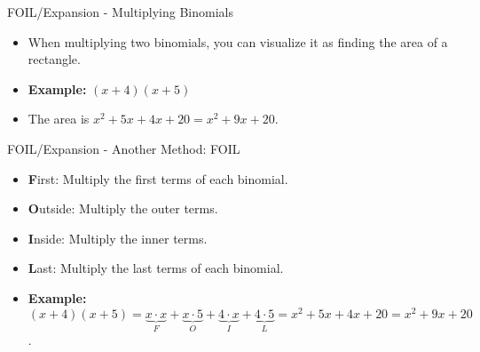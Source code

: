 \documentclass[aspectratio=169]{beamer}
\begin{document}
\begin{frame}{FOIL/Expansion - Multiplying Binomials}
    \begin{tcolorbox}[colback=lightgray,colframe=primary,title=Multiplying Binomials]
        \scriptsize
        \begin{itemize}
            \setlength{\itemsep}{0pt}
            \item When multiplying two binomials, you can visualize it as finding the area of a rectangle.
            \item \textbf{Example: } $(x+4)(x+5)$
            \vspace*{0.5em}
            \begin{center}
            \end{center}
            \vspace*{-0.7em}
            \item The area is $x^2 + 5x + 4x + 20 = x^2 + 9x + 20$.
        \end{itemize}
    \end{tcolorbox}
\end{frame}

\begin{frame}{FOIL/Expansion - Another Method: FOIL}
    \begin{tcolorbox}[colback=lightgray,colframe=primary,title=Another Method: FOIL]
        \scriptsize
        \begin{itemize}
            \setlength{\itemsep}{0pt}
            \item \textbf{F}irst: Multiply the first terms of each binomial.
            \item \textbf{O}utside: Multiply the outer terms.
            \item \textbf{I}nside: Multiply the inner terms.
            \item \textbf{L}ast: Multiply the last terms of each binomial.
            \item \textbf{Example: } $(x+4)(x+5) = \underbrace{x \cdot x}_{F} + \underbrace{x \cdot 5}_{O} + \underbrace{4 \cdot x}_{I} + \underbrace{4 \cdot 5}_{L} = x^2 + 5x + 4x + 20 = x^2 + 9x + 20$.
        \end{itemize}
    \end{tcolorbox}
\end{frame}
\end{document}
